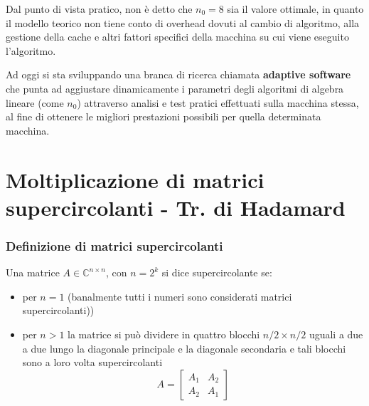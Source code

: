 Dal punto di vista pratico, non è detto che \(n_0 = 8\) sia il valore ottimale, in quanto il modello teorico non tiene conto
di overhead dovuti al cambio di algoritmo, alla gestione della cache e altri fattori specifici della macchina su cui viene
eseguito l'algoritmo.

Ad oggi si sta sviluppando una branca di ricerca chiamata \textbf{adaptive software} che punta ad aggiustare dinamicamente i parametri
degli algoritmi di algebra lineare (come \(n_0\)) attraverso analisi e test pratici effettuati sulla macchina stessa, al fine
di ottenere le migliori prestazioni possibili per quella determinata macchina.

\newpage

\section{Moltiplicazione di matrici supercircolanti - Tr. di Hadamard}
\subsubsection*{Definizione di matrici supercircolanti}
Una matrice \(A \in \mathbb{C}^{n \times n}\), con \(n=2^k\) si dice supercircolante se:
\begin{itemize}
	\item per \(n = 1\) (banalmente tutti i numeri sono considerati matrici supercircolanti))
	\item per \(n > 1\) la matrice si può dividere in quattro blocchi \(n/2 \times n/2\) uguali a due a due lungo la diagonale
	principale e la diagonale secondaria e tali blocchi sono a loro volta supercircolanti
	\[A = \begin{bmatrix} A_1 & A_2 \\ A_2 & A_1 \end{bmatrix} \]
\end{itemize}

